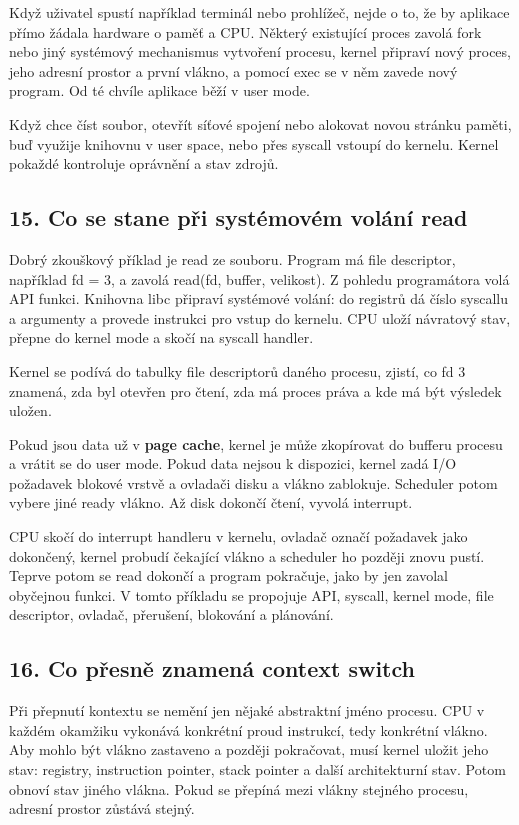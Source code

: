 \documentclass[11pt,a4paper]{article}
\begin{document}
Když uživatel spustí například terminál nebo prohlížeč, nejde o to, že by aplikace přímo žádala hardware o paměť a CPU. Některý existující proces zavolá fork nebo jiný systémový mechanismus vytvoření procesu, kernel připraví nový proces, jeho adresní prostor a první vlákno, a pomocí exec se v něm zavede nový program. Od té chvíle aplikace běží v user mode.

Když chce číst soubor, otevřít síťové spojení nebo alokovat novou stránku paměti, buď využije knihovnu v user space, nebo přes syscall vstoupí do kernelu. Kernel pokaždé kontroluje oprávnění a stav zdrojů.

\subsection*{15. Co se stane při systémovém volání read}

Dobrý zkouškový příklad je read ze souboru. Program má file descriptor, například fd = 3, a zavolá read(fd, buffer, velikost). Z pohledu programátora volá API funkci. Knihovna libc připraví systémové volání: do registrů dá číslo syscallu a argumenty a provede instrukci pro vstup do kernelu. CPU uloží návratový stav, přepne do kernel mode a skočí na syscall handler.

Kernel se podívá do tabulky file descriptorů daného procesu, zjistí, co fd 3 znamená, zda byl otevřen pro čtení, zda má proces práva a kde má být výsledek uložen.

Pokud jsou data už v \textbf{page cache}, kernel je může zkopírovat do bufferu procesu a vrátit se do user mode. Pokud data nejsou k dispozici, kernel zadá I/O požadavek blokové vrstvě a ovladači disku a vlákno zablokuje. Scheduler potom vybere jiné ready vlákno. Až disk dokončí čtení, vyvolá interrupt.

CPU skočí do interrupt handleru v kernelu, ovladač označí požadavek jako dokončený, kernel probudí čekající vlákno a scheduler ho později znovu pustí. Teprve potom se read dokončí a program pokračuje, jako by jen zavolal obyčejnou funkci. V tomto příkladu se propojuje API, syscall, kernel mode, file descriptor, ovladač, přerušení, blokování a plánování.

\subsection*{16. Co přesně znamená context switch}

Při přepnutí kontextu se nemění jen nějaké abstraktní jméno procesu. CPU v každém okamžiku vykonává konkrétní proud instrukcí, tedy konkrétní vlákno. Aby mohlo být vlákno zastaveno a později pokračovat, musí kernel uložit jeho stav: registry, instruction pointer, stack pointer a další architekturní stav. Potom obnoví stav jiného vlákna. Pokud se přepíná mezi vlákny stejného procesu, adresní prostor zůstává stejný.
\end{document}
